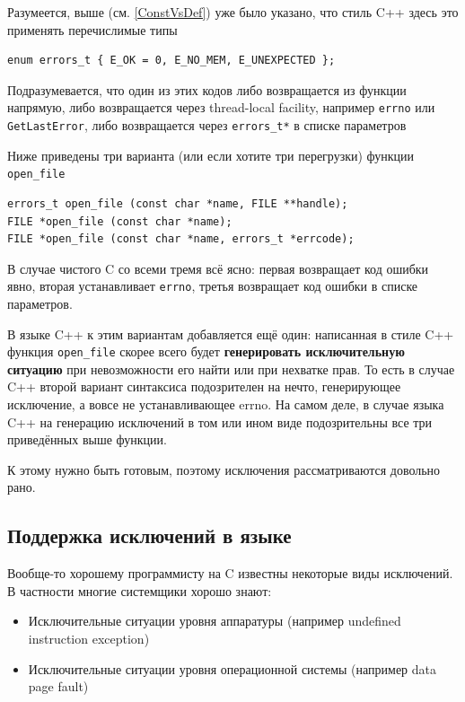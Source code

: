 \documentclass[a4paper,12pt,oneside]{book}
\begin{document}
Разумеется, выше (см. \ref{ConstVsDef}) уже было указано, что стиль C++ здесь это применять перечислимые типы

\begin{lstlisting}
enum errors_t { E_OK = 0, E_NO_MEM, E_UNEXPECTED };
\end{lstlisting}

Подразумевается, что один из этих кодов либо возвращается из функции напрямую, либо возвращается через thread-local facility, например \lstinline!errno! или \lstinline!GetLastError!, либо возвращается через \lstinline!errors_t*! в списке параметров

Ниже приведены три варианта (или если хотите три перегрузки) функции \lstinline!open_file!

\begin{lstlisting}
errors_t open_file (const char *name, FILE **handle);
FILE *open_file (const char *name);
FILE *open_file (const char *name, errors_t *errcode);
\end{lstlisting}

В случае чистого C со всеми тремя всё ясно: первая возвращает код ошибки явно, вторая устанавливает \lstinline!errno!, третья возвращает код ошибки в списке параметров.

В языке C++ к этим вариантам добавляется ещё один: написанная в стиле C++ функция \lstinline!open_file! скорее всего будет \textbf{генерировать исключительную ситуацию} при невозможности его найти или при нехватке прав. То есть в случае C++ второй вариант синтаксиса подозрителен на нечто, генерирующее исключение, а вовсе не устанавливающее errno. На самом деле, в случае языка C++ на генерацию исключений в том или ином виде подозрительны все три приведённых выше функции.

К этому нужно быть готовым, поэтому исключения рассматриваются довольно рано.

\subsection{Поддержка исключений в языке}\label{subsub:exceptionguide}

Вообще-то хорошему программисту на C известны некоторые виды исключений. В частности многие системщики хорошо знают:

\begin{itemize}
\item
Исключительные ситуации уровня аппаратуры (например undefined instruction exception)
\item
Исключительные ситуации уровня операционной системы (например data page fault)
\end{itemize}
\end{document}
